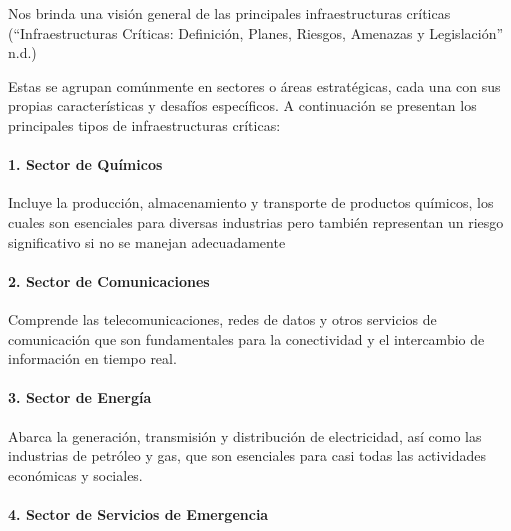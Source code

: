 \documentclass{article}
\begin{document}
Nos brinda una visión general de las principales infraestructuras
críticas ({``Infraestructuras Críticas: Definición, Planes, Riesgos,
Amenazas y Legislación''} n.d.)

Estas se agrupan comúnmente en sectores o áreas estratégicas, cada una
con sus propias características y desafíos específicos. A continuación
se presentan los principales tipos de infraestructuras críticas:

\hypertarget{sector-de-quuxedmicos}{%
\paragraph{\texorpdfstring{1. \textbf{Sector de
Químicos}}{1. Sector de Químicos}}\label{sector-de-quuxedmicos}}

Incluye la producción, almacenamiento y transporte de productos
químicos, los cuales son esenciales para diversas industrias pero
también representan un riesgo significativo si no se manejan
adecuadamente

\hypertarget{sector-de-comunicaciones}{%
\paragraph{\texorpdfstring{2. \textbf{Sector de
Comunicaciones}}{2. Sector de Comunicaciones}}\label{sector-de-comunicaciones}}

Comprende las telecomunicaciones, redes de datos y otros servicios de
comunicación que son fundamentales para la conectividad y el intercambio
de información en tiempo real.

\hypertarget{sector-de-energuxeda}{%
\paragraph{\texorpdfstring{3. \textbf{Sector de
Energía}}{3. Sector de Energía}}\label{sector-de-energuxeda}}

Abarca la generación, transmisión y distribución de electricidad, así
como las industrias de petróleo y gas, que son esenciales para casi
todas las actividades económicas y sociales.

\hypertarget{sector-de-servicios-de-emergencia}{%
\paragraph{\texorpdfstring{4. \textbf{Sector de Servicios de
Emergencia}}{4. Sector de Servicios de Emergencia}}\label{sector-de-servicios-de-emergencia}}
\end{document}
